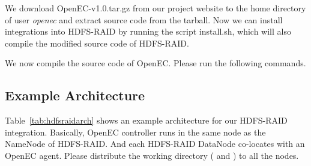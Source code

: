 \documentclass[letterpaper,12pt]{article}
\newcommand{\openec}{{\sf\small OpenEC}\xspace}
\begin{document}
\begin{center}
\noindent{}
\end{center}

We download OpenEC-v1.0.tar.gz from our project website to the home directory of user {\sl openec}
and extract source code from the tarball. Now we can install integrations into HDFS-RAID by running
the script install.sh, which will also compile the modified source code of HDFS-RAID.

\begin{center}
\noindent{}
\end{center}

We now compile the source code of \openec. Please run the following commands.

\begin{center}
\noindent{}
\end{center}

\subsection{Example Architecture}

Table~\ref{tab:hdfsraidarch} shows an example architecture for our HDFS-RAID integration.
Basically, \openec controller runs in the same node as the NameNode of HDFS-RAID.
And each HDFS-RAID DataNode co-locates with an \openec agent. Please distribute
the working directory ( and ) to all 
the nodes.
\end{document}
